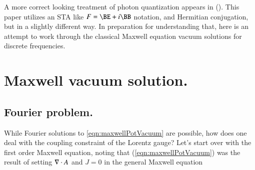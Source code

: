 A more correct looking treatment of photon quantization appears in (\citep{de2004understanding}).  This paper utilizes an STA like $F = \BE + i\BB$ notation, and Hermitian conjugation, but in a slightly different way.  In preparation for understanding that, here is an attempt to work through the classical Maxwell equation vacuum solutions for discrete frequencies.

\section{Maxwell vacuum solution.}

\subsection{Fourier problem.}

While Fourier solutions to \ref{eqn:maxwellPotVacuum} are possible, how does one deal with the coupling constraint of the Lorentz gauge?  Let's start over with the first order Maxwell equation, noting that (\ref{eqn:maxwellPotVacuum}) was the result of setting $\nabla \cdot A$ and $J = 0$ in the general Maxwell equation

\EndArticle

